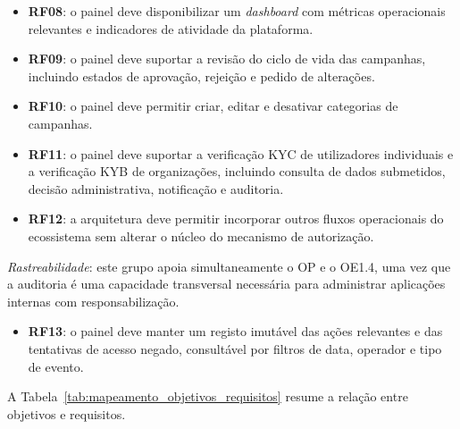\begin{itemize}
  \item \textbf{RF08}: o painel deve disponibilizar um \textit{dashboard} com métricas operacionais relevantes e indicadores de atividade da plataforma.
  \item \textbf{RF09}: o painel deve suportar a revisão do ciclo de vida das campanhas, incluindo estados de aprovação, rejeição e pedido de alterações.
  \item \textbf{RF10}: o painel deve permitir criar, editar e desativar categorias de campanhas.
  \item \textbf{RF11}: o painel deve suportar a verificação \gls{KYC} de utilizadores individuais e a verificação \gls{KYB} de organizações, incluindo consulta de dados submetidos, decisão administrativa, notificação e auditoria.
  \item \textbf{RF12}: a arquitetura deve permitir incorporar outros fluxos operacionais do ecossistema sem alterar o núcleo do mecanismo de autorização.
\end{itemize}

\medskip\noindent\textit{Rastreabilidade}: este grupo apoia simultaneamente o OP e o OE1.4, uma vez que a auditoria é uma capacidade transversal necessária para administrar aplicações internas com responsabilização.

\begin{itemize}
  \item \textbf{RF13}: o painel deve manter um registo imutável das ações relevantes e das tentativas de acesso negado, consultável por filtros de data, operador e tipo de evento.
\end{itemize}

A Tabela~\ref{tab:mapeamento_objetivos_requisitos} resume a relação entre objetivos e requisitos.

